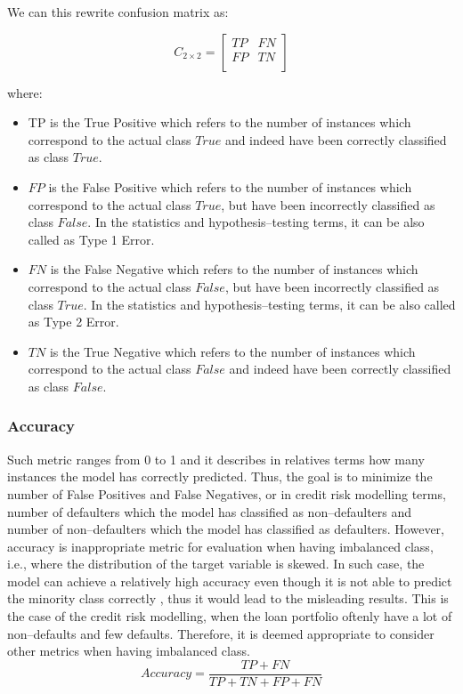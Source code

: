 We can this rewrite confusion matrix as:

\begin{equation}
    C_{2 \times 2} = \begin{bmatrix}
    TP & FN \\
    FP & TN \\
    \end{bmatrix}
\end{equation}

where:
\begin{itemize}\setlength\itemsep{0em}
    \item TP is the True Positive which refers to the number of instances which correspond to the actual class $True$ and indeed have been correctly classified as class $True$.
	\item $FP$ is the False Positive which refers to the number of instances which correspond to the actual class $True$, but have been incorrectly classified as class $False$. In the statistics and hypothesis--testing terms, it can be also called as Type 1 Error.
	\item $FN$ is the False Negative which refers to the number of instances which correspond to the actual class $False$, but have been incorrectly classified as class $True$. In the statistics and hypothesis--testing terms, it can be also called as Type 2 Error.
	\item $TN$ is the True Negative which refers to the number of instances which correspond to the actual class $False$ and indeed have been correctly classified as class $False$.
\end{itemize}

\subsubsection{Accuracy}
Such metric ranges from 0 to 1 and it describes in relatives terms how many instances the model has correctly predicted. Thus, the goal is to minimize the number of False Positives and False Negatives, or in credit risk modelling terms, number of defaulters which the model has classified as non--defaulters and number of non--defaulters which the model has classified as defaulters.
However, accuracy is inappropriate metric for evaluation when having imbalanced class, i.e., where the distribution of the target variable is skewed.
In such case, the model can achieve a relatively high accuracy even though it is not able to predict the minority class correctly \citep{brownlee2021failure}, thus it would lead to the misleading results.
This is the case of the credit risk modelling, when the loan portfolio oftenly have a lot of non--defaults and few defaults.
Therefore, it is deemed appropriate to consider other metrics when having imbalanced class.
\begin{equation}\label{eq}
    Accuracy = \frac{TP + FN}{TP + TN + FP + FN}
\end{equation}

